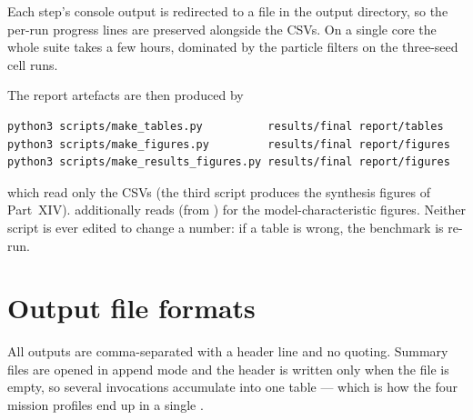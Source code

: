 Each step's console output is redirected to a  file in the output directory, so the
per-run progress lines are preserved alongside the CSVs. On a single core the whole suite takes a
few hours, dominated by the particle filters on the three-seed cell runs.

The report artefacts are then produced by
\begin{lstlisting}[language=bash]
python3 scripts/make_tables.py          results/final report/tables
python3 scripts/make_figures.py         results/final report/figures
python3 scripts/make_results_figures.py results/final report/figures
\end{lstlisting}
which read only the CSVs (the third script produces the synthesis figures of Part~XIV).  additionally reads  (from
) for the model-characteristic figures. Neither script is ever edited to
change a number: if a table is wrong, the benchmark is re-run.

\section{Output file formats}

All outputs are comma-separated with a header line and no quoting. Summary files are opened in
append mode and the header is written only when the file is empty, so several invocations
accumulate into one table --- which is how the four mission profiles end up in a single
.

